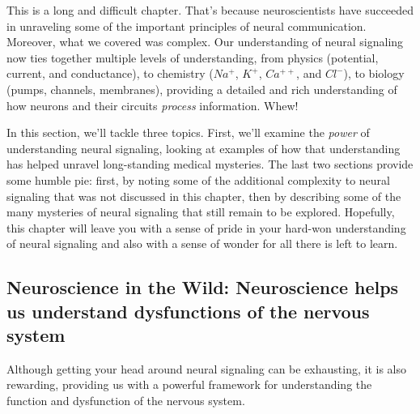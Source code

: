 \documentclass[
]{book}
\begin{document}
This is a long and difficult chapter. That's because neuroscientists have succeeded in unraveling some of the important principles of neural communication. Moreover, what we covered was complex. Our understanding of neural signaling now ties together multiple levels of understanding, from physics (potential, current, and conductance), to chemistry (\(Na^+\), \(K^+\), \(Ca^{++}\), and \(Cl^{-}\)), to biology (pumps, channels, membranes), providing a detailed and rich understanding of how neurons and their circuits \emph{process} information. Whew!

In this section, we'll tackle three topics. First, we'll examine the \emph{power} of understanding neural signaling, looking at examples of how that understanding has helped unravel long-standing medical mysteries. The last two sections provide some humble pie: first, by noting some of the additional complexity to neural signaling that was not discussed in this chapter, then by describing some of the many mysteries of neural signaling that still remain to be explored. Hopefully, this chapter will leave you with a sense of pride in your hard-won understanding of neural signaling and also with a sense of wonder for all there is left to learn.

\hypertarget{neuroscience-in-the-wild-neuroscience-helps-us-understand-dysfunctions-of-the-nervous-system}{%
\subsection{Neuroscience in the Wild: Neuroscience helps us understand dysfunctions of the nervous system}\label{neuroscience-in-the-wild-neuroscience-helps-us-understand-dysfunctions-of-the-nervous-system}}

Although getting your head around neural signaling can be exhausting, it is also rewarding, providing us with a powerful framework for understanding the function and dysfunction of the nervous system.
\end{document}

